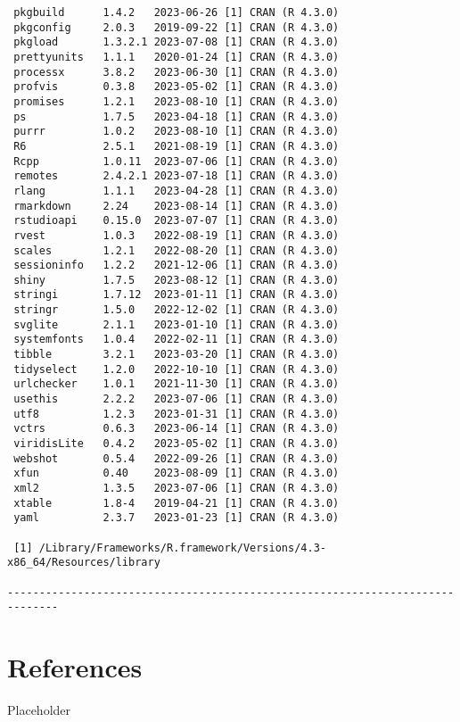 \documentclass[twoside,12pt,final]{ucthesis-CA2012}
\begin{document}
\begin{ucmainmatter}
\begin{verbatim}
 pkgbuild      1.4.2   2023-06-26 [1] CRAN (R 4.3.0)
 pkgconfig     2.0.3   2019-09-22 [1] CRAN (R 4.3.0)
 pkgload       1.3.2.1 2023-07-08 [1] CRAN (R 4.3.0)
 prettyunits   1.1.1   2020-01-24 [1] CRAN (R 4.3.0)
 processx      3.8.2   2023-06-30 [1] CRAN (R 4.3.0)
 profvis       0.3.8   2023-05-02 [1] CRAN (R 4.3.0)
 promises      1.2.1   2023-08-10 [1] CRAN (R 4.3.0)
 ps            1.7.5   2023-04-18 [1] CRAN (R 4.3.0)
 purrr         1.0.2   2023-08-10 [1] CRAN (R 4.3.0)
 R6            2.5.1   2021-08-19 [1] CRAN (R 4.3.0)
 Rcpp          1.0.11  2023-07-06 [1] CRAN (R 4.3.0)
 remotes       2.4.2.1 2023-07-18 [1] CRAN (R 4.3.0)
 rlang         1.1.1   2023-04-28 [1] CRAN (R 4.3.0)
 rmarkdown     2.24    2023-08-14 [1] CRAN (R 4.3.0)
 rstudioapi    0.15.0  2023-07-07 [1] CRAN (R 4.3.0)
 rvest         1.0.3   2022-08-19 [1] CRAN (R 4.3.0)
 scales        1.2.1   2022-08-20 [1] CRAN (R 4.3.0)
 sessioninfo   1.2.2   2021-12-06 [1] CRAN (R 4.3.0)
 shiny         1.7.5   2023-08-12 [1] CRAN (R 4.3.0)
 stringi       1.7.12  2023-01-11 [1] CRAN (R 4.3.0)
 stringr       1.5.0   2022-12-02 [1] CRAN (R 4.3.0)
 svglite       2.1.1   2023-01-10 [1] CRAN (R 4.3.0)
 systemfonts   1.0.4   2022-02-11 [1] CRAN (R 4.3.0)
 tibble        3.2.1   2023-03-20 [1] CRAN (R 4.3.0)
 tidyselect    1.2.0   2022-10-10 [1] CRAN (R 4.3.0)
 urlchecker    1.0.1   2021-11-30 [1] CRAN (R 4.3.0)
 usethis       2.2.2   2023-07-06 [1] CRAN (R 4.3.0)
 utf8          1.2.3   2023-01-31 [1] CRAN (R 4.3.0)
 vctrs         0.6.3   2023-06-14 [1] CRAN (R 4.3.0)
 viridisLite   0.4.2   2023-05-02 [1] CRAN (R 4.3.0)
 webshot       0.5.4   2022-09-26 [1] CRAN (R 4.3.0)
 xfun          0.40    2023-08-09 [1] CRAN (R 4.3.0)
 xml2          1.3.5   2023-07-06 [1] CRAN (R 4.3.0)
 xtable        1.8-4   2019-04-21 [1] CRAN (R 4.3.0)
 yaml          2.3.7   2023-01-23 [1] CRAN (R 4.3.0)

 [1] /Library/Frameworks/R.framework/Versions/4.3-x86_64/Resources/library

------------------------------------------------------------------------------
\end{verbatim}
\hypertarget{references}{%
\chapter*{References}\label{references}}

Placeholder

\end{ucmainmatter}
\end{document}
